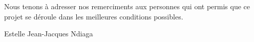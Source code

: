 Nous tenons à adresser nos remerciments aux personnes qui ont permis que ce projet se déroule dans les meilleures conditions possibles.

 Estelle
 Jean-Jacques
 Ndiaga 


